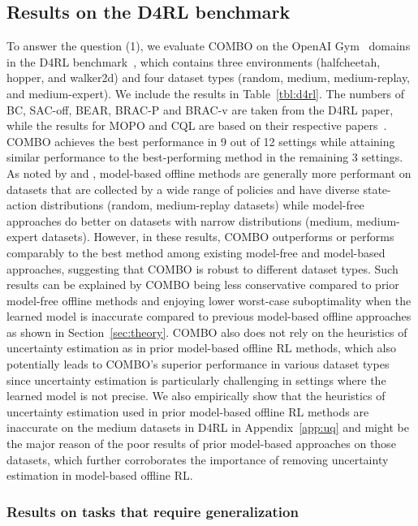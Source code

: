 \vspace*{-5pt}
\subsection{Results on the D4RL benchmark}
\label{sec:d4rl_exps}

To answer the question (1), we evaluate COMBO on the OpenAI Gym~\citep{brockman2016openai} domains in the D4RL benchmark~\citep{fu2020d4rl}, which contains three environments (halfcheetah, hopper, and walker2d) and four dataset types (random, medium, medium-replay, and medium-expert). We include the results in Table~\ref{tbl:d4rl}. The numbers of BC, SAC-off, BEAR, BRAC-P and BRAC-v are taken from the D4RL paper, while the results for MOPO and CQL are based on their respective papers~\citep{yu2020mopo,kumar2020conservative}. COMBO achieves the best performance in 9 out of 12 settings while attaining similar performance to the best-performing method in the remaining 3 settings. As noted by \citet{yu2020mopo} and \citet{Rafailov2020LOMPO}, model-based offline methods are generally more performant on datasets that are collected by a wide range of policies and have diverse state-action distributions (random, medium-replay datasets) while model-free approaches do better on datasets with narrow distributions (medium, medium-expert datasets). However, in these results, COMBO outperforms or performs comparably to the best method among existing model-free and model-based approaches, suggesting that COMBO is robust to different dataset types. Such results can be explained by COMBO being less conservative compared to prior model-free offline methods and enjoying lower worst-case suboptimality when the learned model is inaccurate compared to previous model-based offline approaches as shown in Section~\ref{sec:theory}. COMBO also does not rely on the heuristics of uncertainty estimation as in prior model-based offline RL methods, which also potentially leads to COMBO's superior performance in various dataset types since uncertainty estimation is particularly challenging in settings where the learned model is not precise. We also empirically show that the heuristics of uncertainty estimation used in prior model-based offline RL methods are inaccurate on the medium datasets in D4RL in Appendix~\ref{app:uq} and might be the major reason of the poor results of prior model-based approaches on those datasets, which further corroborates the importance of removing uncertainty estimation in model-based offline RL.

\subsubsection{Results on tasks that require generalization}
\label{sec:generalization_exps}

